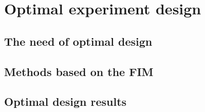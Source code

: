 \chapter{Optimal experiment design}
\label{sec:OptimalExperimentDesign}

\section{The need of optimal design}
\label{sec:TheNeedOfOptimalDesign}

\section{Methods based on the FIM}
\label{sec:MethodsBasedOnTheFIM}

\section{Optimal design results}
\label{sec:OptimalDesignResults}
